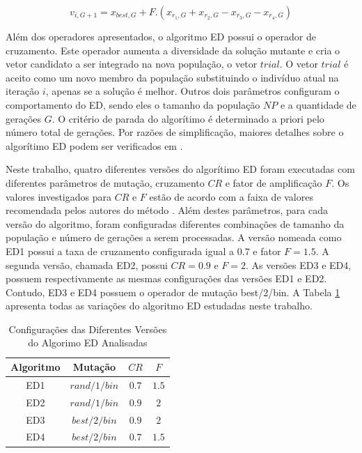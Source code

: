 \documentclass[12pt,A4,A4pt]{article}
\begin{document}
\begin{equation}
v_{i,G+1} = x_{{best},G} + F . (x_{r_{1},G} + x_{r_{2},G} - x_{r_{3},G} - x_{r_{4},G}) \label{trial2}
\end{equation}


Além dos operadores apresentados, o algoritmo ED possui o operador de cruzamento. Este operador aumenta a diversidade da solução mutante e cria o vetor candidato a ser integrado na nova população, o vetor $trial$. O vetor $trial$ é aceito como um novo membro da população substituindo o indivíduo atual na iteração $i$, apenas se a solução é melhor. Outros dois parâmetros configuram o comportamento do ED, sendo eles o tamanho da população $NP$ e a quantidade de gerações $G$. O critério de parada do algorítimo é determinado a priori pelo número total de gerações. Por razões de simplificação, maiores detalhes sobre o algorítimo ED podem ser verificados em \cite{Storn1997}.

Neste trabalho, quatro diferentes versões do algorítimo ED foram executadas com diferentes parâmetros de mutação, cruzamento $CR$ e fator de amplificação $F$. Os valores investigados para $CR$ e $F$ estão de acordo com a faixa de  valores recomendada pelos autores do método \citep{Storn1997}. Além destes parâmetros, para cada versão do algoritmo, foram configuradas diferentes combinações de tamanho da população e número de gerações a serem processadas. A versão nomeada como ED1 possui a taxa de cruzamento  configurada igual a $0.7$ e fator $F = 1.5$. A segunda versão, chamada ED2, possui $CR = 0.9$ e $F = 2$. As versões ED3 e
ED4, possuem respectivamente as mesmas configurações das versões ED1 e ED2. Contudo, ED3 e ED4 possuem o operador de mutação best/2/bin. A Tabela \ref{tab:algos} apresenta todas as variações do algoritmo ED estudadas neste trabalho.

\begin{table}[htbp]
\small
\centering
\caption{\small Configurações das Diferentes Versões do Algorimo ED Analisadas}
\begin{tabular}{cccc}
\hline
Algoritmo & Mutação & $CR$ & $F$ \\
\hline
ED1 & $rand/1/bin$ & $0.7$ & $1.5$  \\
ED2 & $rand/1/bin$ & $0.9$ & $2$  \\
ED3 & $best/2/bin$ & $0.9$ & $2$  \\
ED4 & $best/2/bin$ & $0.7$ & $1.5$  \\
\hline
\end{tabular}
  \label{tab:algos}
\end{table}
\end{document}
